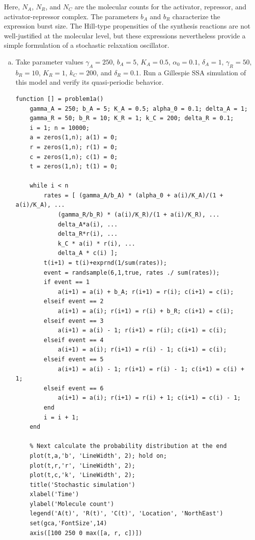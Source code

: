 \documentclass{article}
\begin{document}
Here, $N_A$, $N_R$, and $N_C$ are the molecular counts for the activator, repressor, and activator-repressor complex. The parameters $b_A$ and $b_R$ characterize the expression burst size. The Hill-type propensities of the synthesis reactions are not well-justified at the molecular level, but these expressions nevertheless provide a simple formulation of a stochastic relaxation oscillator.

\begin{enumerate}[a)]
\item Take parameter values $\gamma_A = 250$, $b_A = 5$, $K_A = 0.5$, $\alpha_0 = 0.1$, $\delta_A = 1$, $\gamma_R = 50$, $b_R = 10$, $K_R=1$, $k_C = 200$, and $\delta_R = 0.1$. Run a Gillespie SSA simulation of this model and verify its quasi-periodic behavior.\\

\begin{lstlisting}
function [] = problem1a()
    gamma_A = 250; b_A = 5; K_A = 0.5; alpha_0 = 0.1; delta_A = 1;
    gamma_R = 50; b_R = 10; K_R = 1; k_C = 200; delta_R = 0.1;
    i = 1; n = 10000;
    a = zeros(1,n); a(1) = 0;
    r = zeros(1,n); r(1) = 0;
    c = zeros(1,n); c(1) = 0;
    t = zeros(1,n); t(1) = 0;
    
    while i < n
        rates = [ (gamma_A/b_A) * (alpha_0 + a(i)/K_A)/(1 + a(i)/K_A), ...
            (gamma_R/b_R) * (a(i)/K_R)/(1 + a(i)/K_R), ...
            delta_A*a(i), ...
            delta_R*r(i), ...
            k_C * a(i) * r(i), ...
            delta_A * c(i) ];
        t(i+1) = t(i)+exprnd(1/sum(rates));
        event = randsample(6,1,true, rates ./ sum(rates));
        if event == 1
            a(i+1) = a(i) + b_A; r(i+1) = r(i); c(i+1) = c(i);
        elseif event == 2
            a(i+1) = a(i); r(i+1) = r(i) + b_R; c(i+1) = c(i);
        elseif event == 3
            a(i+1) = a(i) - 1; r(i+1) = r(i); c(i+1) = c(i);
        elseif event == 4
            a(i+1) = a(i); r(i+1) = r(i) - 1; c(i+1) = c(i);
        elseif event == 5
            a(i+1) = a(i) - 1; r(i+1) = r(i) - 1; c(i+1) = c(i) + 1;
        elseif event == 6
            a(i+1) = a(i); r(i+1) = r(i) + 1; c(i+1) = c(i) - 1;
        end
        i = i + 1;
    end
    
    % Next calculate the probability distribution at the end
    plot(t,a,'b', 'LineWidth', 2); hold on;
    plot(t,r,'r', 'LineWidth', 2);
    plot(t,c,'k', 'LineWidth', 2);
    title('Stochastic simulation')
    xlabel('Time')
    ylabel('Molecule count')
    legend('A(t)', 'R(t)', 'C(t)', 'Location', 'NorthEast')
    set(gca,'FontSize',14)
    axis([100 250 0 max([a, r, c])])
    

\end{lstlisting}
\end{enumerate}
\end{document}
